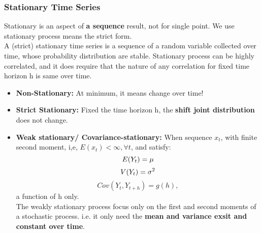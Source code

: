 \documentclass[12pt]{article}
\begin{document}
{\color{RoyalBlue}
\subsubsection{Stationary Time Series}}

Stationary is an aspect of \textbf{a sequence} result, not for single point. We use stationary process means the strict form. \\
A (strict) stationary time series is a sequence of a random variable collected over time, whose probability distribution are stable. Stationary process can be highly correlated, and it does require that the nature of any correlation for fixed time horizon h is same over time.\\ 

\begin{itemize}

\item \textbf{Non-Stationary: } At minimum, it means change over time!

\item \textbf{Strict Stationary: } Fixed the time horizon h, the \textbf{shift joint distribution} does not change. 

\item \textbf{Weak stationary/ Covariance-stationary: } When sequence ${x_t}$, with finite second moment, i,e, $E(x_t) < \infty , \forall t$, and satisfy:
\begin{equation}
E(Y_t) = \mu  \\
\end{equation}
\begin{equation}
V(Y_t) = \sigma^2 \\
\end{equation}
\begin{equation}
Cov(Y_t, Y_{t+h}) = g(h), 
\end{equation} a function of h only. 
\\

The weakly stationary process focus only on the first and second moments of a stochastic process. i.e. it only need the \textbf{mean and variance exsit and constant over time}.
\end{itemize}
\end{document}
